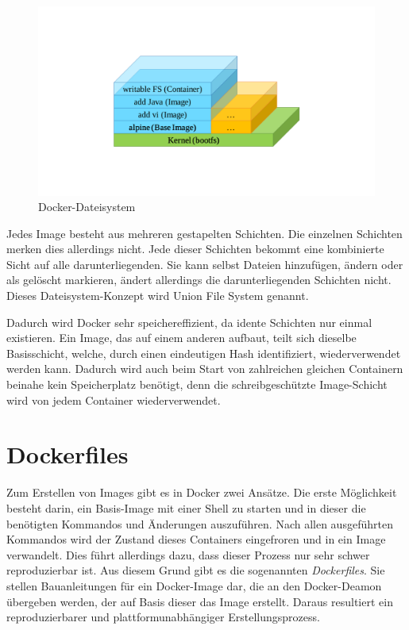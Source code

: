 \begin{figure}[htbp]
    \centering
    \includegraphics[width=0.7\linewidth,clip,trim=130 130 130 110]{images/docker-filesystem}
    \caption{Docker-Dateisystem}
\label{fig:docker-dateisystem}
\end{figure}

Jedes Image besteht aus mehreren gestapelten Schichten.
Die einzelnen Schichten merken dies allerdings nicht.
Jede dieser Schichten bekommt eine kombinierte Sicht auf alle darunterliegenden.
Sie kann selbst Dateien hinzufügen, ändern oder als gelöscht markieren, ändert allerdings die darunterliegenden Schichten nicht.
Dieses Dateisystem-Konzept wird Union File System genannt.

Dadurch wird Docker sehr speichereffizient, da idente Schichten nur einmal existieren.
Ein Image, das auf einem anderen aufbaut, teilt sich dieselbe Basisschicht, welche, durch einen eindeutigen Hash identifiziert, wiederverwendet werden kann.
Dadurch wird auch beim Start von zahlreichen gleichen Containern beinahe kein Speicherplatz benötigt, denn die schreibgeschützte Image-Schicht wird von jedem Container wiederverwendet.


\section{Dockerfiles}
\label{sec:dockerfiles}
Zum Erstellen von Images gibt es in Docker zwei Ansätze.
Die erste Möglichkeit besteht darin, ein Basis-Image mit einer Shell zu starten und in dieser die benötigten Kommandos und Änderungen auszuführen.
Nach allen ausgeführten Kommandos wird der Zustand dieses Containers eingefroren und in ein Image verwandelt.
Dies führt allerdings dazu, dass dieser Prozess nur sehr schwer reproduzierbar ist.
Aus diesem Grund gibt es die sogenannten \emph{Dockerfiles}.
Sie stellen Bauanleitungen für ein Docker-Image dar, die an den Docker-Deamon übergeben werden, der auf Basis dieser das Image erstellt.
Daraus resultiert ein reproduzierbarer und plattformunabhängiger Erstellungsprozess.

